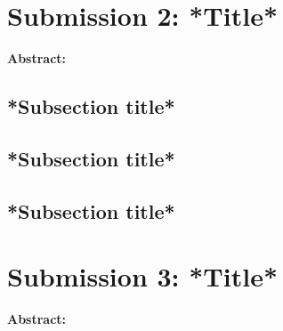\documentclass[a4paper, 10pt]{article}
\begin{document}
\section{Submission 2: *Title*}

\textbf{Abstract: }




\begin{multicols*}{2}
\vspace{0.3cm}
\subsection{*Subsection title*}




\vspace{0.3cm}
\subsection{*Subsection title*}




\vspace{0.3cm}
\subsection{*Subsection title*}




\end{multicols*}



\newpage
\section{Submission 3: *Title* }

\textbf{Abstract: }
\end{document}
